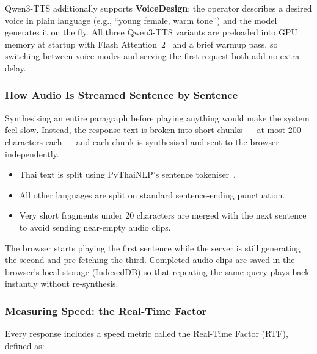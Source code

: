 \documentclass[10pt, a4paper, twocolumn]{article}
\begin{document}
\noindent Qwen3-TTS additionally supports \textbf{VoiceDesign}: the
operator describes a desired voice in plain language (e.g.,
``young female, warm tone'') and the model generates it on the fly.
All three Qwen3-TTS variants are preloaded into GPU memory at startup
with Flash Attention~2~\cite{dao2022flashattention} and a brief warmup
pass, so switching between voice modes and serving the first request both
add no extra delay.

\subsubsection{How Audio Is Streamed Sentence by Sentence}

Synthesising an entire paragraph before playing anything would make the
system feel slow.
Instead, the response text is broken into short chunks --- at most
200 characters each --- and each chunk is synthesised and sent to the
browser independently.

\begin{itemize}[nosep]
    \item Thai text is split using PyThaiNLP's sentence
          tokeniser~\cite{pythainlp}.
    \item All other languages are split on standard sentence-ending
          punctuation.
    \item Very short fragments under 20 characters are merged with the
          next sentence to avoid sending near-empty audio clips.
\end{itemize}

\noindent The browser starts playing the first sentence while the server
is still generating the second and pre-fetching the third.
Completed audio clips are saved in the browser's local storage
(IndexedDB) so that repeating the same query plays back instantly
without re-synthesis.

\subsubsection{Measuring Speed: the Real-Time Factor}

Every response includes a speed metric called the Real-Time Factor (RTF),
defined as:
\end{document}

